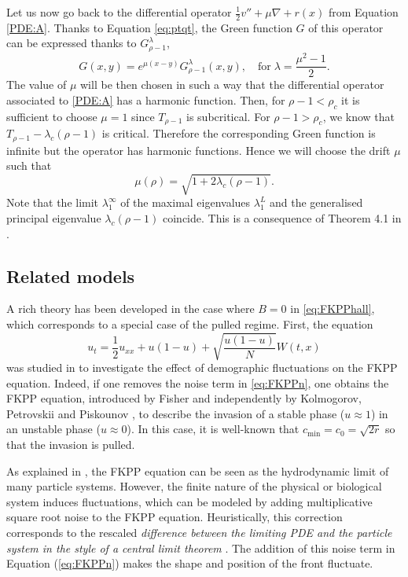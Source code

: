 \documentclass[11pt]{article}
\theoremstyle{plain}
\newcommand\linf{\lambda_1^\infty}
\begin{document}
Let us now go back to the differential operator $\frac{1}{2}v''+\mu \nabla+r(x)$ from Equation \eqref{PDE:A}. Thanks to Equation \eqref{eq:ptqt}, the Green function $G$ of this operator  can be expressed thanks to $G^\lambda_{\rho-1}$,
\begin{equation*}
G(x,y)=e^{\mu(x-y)}G_{\rho-1}^{\lambda}(x,y), \quad\text{for} \; \lambda=\frac{\mu^2-1}{2} .
\end{equation*}
The value of $\mu$ will be then chosen in such a way that the differential operator associated to \eqref{PDE:A} has a harmonic function. Then, for $\rho-1<\rho_c$ it is sufficient to choose $\mu=1$ since $T_{\rho-1}$ is subcritical. For $\rho-1>\rho_c$, we know that $T_{\rho-1}-\lambda_c(\rho-1)$ is critical. Therefore the corresponding Green function is infinite but the operator has harmonic functions. Hence we will choose the drift $\mu$ such that 
\begin{equation*}
\mu(\rho)=\sqrt{1+2\lambda_c(\rho-1)}.
\end{equation*}  
Note that the limit $\linf$ of the maximal eigenvalues $\lambda_1^L$ and the generalised principal eigenvalue $\lambda_c(\rho-1)$ coincide. This is a consequence of Theorem 4.1 in \cite{Pinsky1995}.


\subsection{Related models}\label{relmod}
A rich theory has been developed in the case where $B=0$ in \eqref{eq:FKPPhall}, which corresponds to a special case of the pulled regime. First, the equation
\begin{equation}
\label{eq:FKPPn}
u_t=\frac{1}{2}u_{xx}+u(1-u)+\sqrt{\frac{u(1-u)}{N}}W(t,x)
\end{equation}
was studied in \cite{Brunet2006} to investigate the effect of demographic fluctuations on the FKPP equation. Indeed, if one removes the noise term in \eqref{eq:FKPPn}, one  obtains the FKPP equation, introduced by Fisher \cite{Fisher:1937wr} and independently by Kolmogorov, Petrovskii and Piskounov \cite{Kolmogorov:1937tc}, to describe the invasion of a stable phase ($u\approx1$) in an unstable phase ($u\approx0$). In this case, it is well-known \cite{Kolmogorov:1937tc} that $c_{\min}=c_0=\sqrt{2r}$ so that the invasion is pulled.


As explained in \cite{Panja2004}, the FKPP equation can be seen as the hydrodynamic limit of many particle systems. However, the finite nature of the physical or biological system induces fluctuations, which can be modeled by adding multiplicative square root noise to the FKPP equation. Heuristically, this correction corresponds to the rescaled \textit{difference between the limiting PDE and the particle system in the style of a central limit theorem}   \cite{Mueller:1994wa}. The addition of this noise term in Equation (\ref{eq:FKPPn}) makes the shape and position of the front fluctuate.
\end{document}
